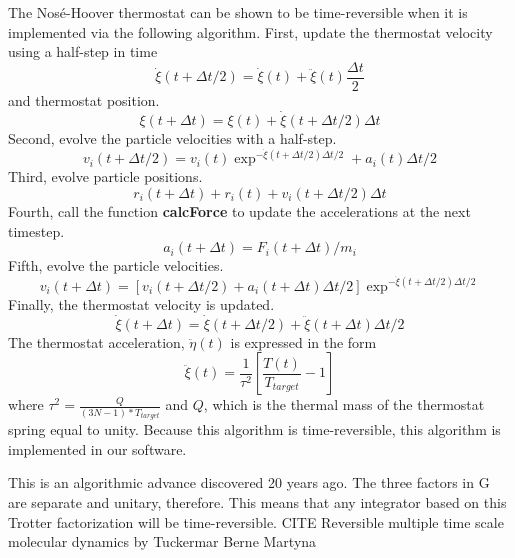 \documentclass[12pt]{article}
\begin{document}
The Nos\'{e}-Hoover thermostat can be shown to be time-reversible when it is implemented via the following algorithm.
First, update the thermostat velocity using a half-step in time
\begin{equation}
\dot{\xi} (t+ \Delta t/2) = \dot{\xi}(t) + \ddot{\xi}(t) \frac{\Delta t}{2}
\end{equation}
and thermostat position.
\begin{equation}
\xi (t+ \Delta t) = \xi(t) + \dot{\xi}(t+\Delta t/2)\Delta t
\end{equation}
Second, evolve the particle velocities with a half-step.
\begin{equation}
v_i (t+\Delta t/2) = v_i (t) \exp^{-\dot{\xi}(t+\Delta t/2) \Delta t/2} + a_{i} (t) \Delta t/2
\end{equation}
Third, evolve particle positions.
\begin{equation}
r_{i} (t+\Delta t) + r_{i} (t) + v_{i}(t+ \Delta t/2) \Delta t
\end{equation}
Fourth, call the function \textbf{calcForce} to update the accelerations at the next timestep.
\begin{equation}
a_{i} (t+\Delta t) = F_{i} (t+ \Delta t)/m_{i}
\end{equation}
Fifth, evolve the particle velocities.
\begin{equation}
v_{i} (t+ \Delta t)  = [v_{i}(t+\Delta t/2) + a_{i}(t+\Delta t) \Delta t/2]\exp^{-\dot{\xi}(t+\Delta t/2) \Delta t/2}
\end{equation}
Finally, the thermostat velocity is updated.
\begin{equation}
\dot{\xi}(t+\Delta t) = \dot{\xi} (t+\Delta t/2) + \ddot{\xi} (t+\Delta t) \Delta t /2
\end{equation}
The thermostat acceleration, $\ddot{\eta}(t)$ is expressed in the form
\begin{equation}
\ddot{\xi}(t) = \frac{1}{\tau^{2}} [\frac{T(t)}{T_{target}} -1 ]
\end{equation}
where $\tau^{2} = \frac{Q}{(3N-1)*T_{target}}$ and $Q$, which is the thermal mass of the thermostat spring equal to unity.
Because this algorithm is time-reversible, this algorithm is implemented in our software.

This is an algorithmic advance discovered 20 years ago.
The three factors in G are separate and unitary, therefore. This means that any integrator  based on this Trotter factorization will be time-reversible. CITE Reversible multiple time scale molecular dynamics by Tuckermar Berne Martyna
\end{document}

